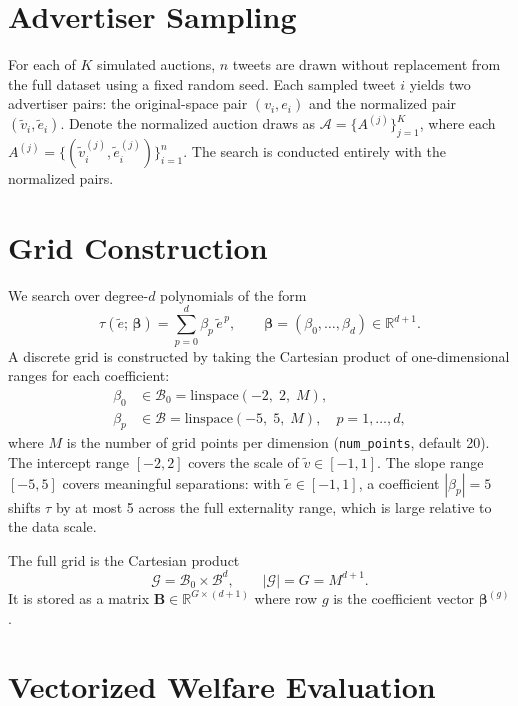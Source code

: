 \documentclass[11pt]{article}
\newcommand{\tv}{\tilde{v}}
\newcommand{\te}{\tilde{e}}
\newcommand{\bsbeta}{\boldsymbol{\beta}}
\begin{document}
\section{Advertiser Sampling}

For each of $K$ simulated auctions, $n$ tweets are drawn without replacement
from the full dataset using a fixed random seed. Each sampled tweet $i$
yields two advertiser pairs: the original-space pair $(v_i, e_i)$ and the
normalized pair $(\tv_i, \te_i)$. Denote the normalized auction draws as
$\mathcal{A} = \bigl\{ A^{(j)} \bigr\}_{j=1}^{K}$,
where each $A^{(j)} = \bigl\{(\tv_i^{(j)}, \te_i^{(j)})\bigr\}_{i=1}^{n}$.
The search is conducted entirely with the normalized pairs.

\section{Grid Construction}

We search over degree-$d$ polynomials of the form
\begin{equation}
    \tau(\te;\,\bsbeta) = \sum_{p=0}^{d} \beta_p\, \te^{\,p},
    \qquad \bsbeta = (\beta_0, \ldots, \beta_d) \in \mathbb{R}^{d+1}.
\end{equation}
A discrete grid is constructed by taking the Cartesian product of
one-dimensional ranges for each coefficient:
\begin{align}
    \beta_0 &\in \mathcal{B}_0 = \text{linspace}(-2,\; 2,\; M), \\
    \beta_p &\in \mathcal{B} = \text{linspace}(-5,\; 5,\; M), \quad p = 1, \ldots, d,
\end{align}
where $M$ is the number of grid points per dimension (\texttt{num\_points}, default 20).
The intercept range $[-2, 2]$ covers the scale of $\tilde{v} \in [-1,1]$.
The slope range $[-5, 5]$ covers meaningful separations: with $\te \in [-1,1]$,
a coefficient $|\beta_p| = 5$ shifts $\tau$ by at most 5 across the full
externality range, which is large relative to the data scale.

The full grid is the Cartesian product
\begin{equation}
    \mathcal{G} = \mathcal{B}_0 \times \mathcal{B}^d,
    \qquad |\mathcal{G}| = G = M^{d+1}.
\end{equation}
It is stored as a matrix $\mathbf{B} \in \mathbb{R}^{G \times (d+1)}$
where row $g$ is the coefficient vector $\bsbeta^{(g)}$.

\section{Vectorized Welfare Evaluation}
\end{document}
